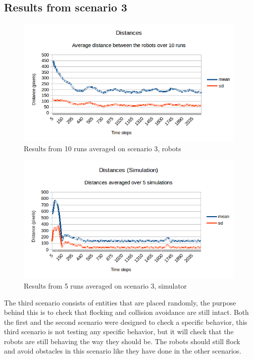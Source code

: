 \subsection{Results from scenario 3}
\label{sec:res3}
\begin{figure}[h]
\begin{center}
\includegraphics[width=0.8\linewidth]{figs/runs/3pdist}
\end{center}
\caption[3. Distances, robots]{Results from 10 runs averaged on scenario 3, robots}
\label{fig:res3pdist}
\end{figure}
\begin{figure}[h]
\begin{center}
\includegraphics[width=0.8\linewidth]{figs/runs/3sdist}
\end{center}
\caption[3. Distances, simulation]{Results from 5 runs averaged on scenario 3, simulator}
\label{fig:res3sdist}
\end{figure}
The third scenario consists of entities that are placed randomly, the purpose behind this is to check that flocking and collision avoidance are still intact. Both the first and the second scenario were designed to check a specific behavior, this third scenario is not testing any specific behavior, but it will check that the robots are still behaving the way they should be. The robots should still flock and avoid obstacles in this scenario like they have done in the other scenarios.

